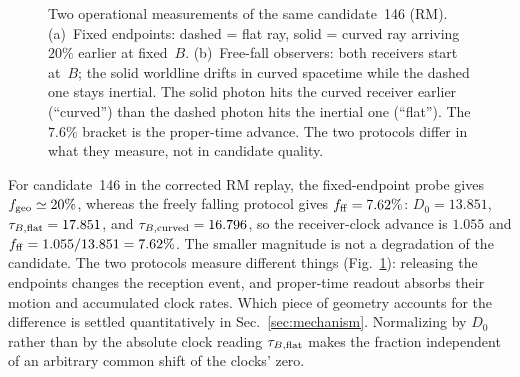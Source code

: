 \documentclass[twocolumn,floatfix,aps,prd,nofootinbib]{revtex4-2}
\begin{document}
\begin{figure}[tbp]
{}
\caption{Two operational measurements of the same candidate~146 (RM).
(a)~Fixed endpoints: dashed = flat ray, solid = curved ray arriving $20\%$
earlier at fixed~$B$.
(b)~Free-fall observers: both receivers start at~$B$; the solid worldline
drifts in curved spacetime while the dashed one stays inertial. The solid
photon hits the curved receiver earlier (``curved'') than the dashed photon
hits the inertial one (``flat''). The $7.6\%$ bracket is the proper-time
advance. The two protocols differ in what they measure, not in candidate
quality.}
\label{fig:timing_protocols}
\end{figure}

For candidate~146 in the corrected RM replay, the fixed-endpoint probe gives
$f_{\rm geo}\simeq20\%$, whereas the freely falling protocol gives
$f_{\rm ff}=7.62\%$: $D_0=13.851$, $\tau_{B,\rm flat}=17.851$, and
$\tau_{B,\rm curved}=16.796$, so the receiver-clock advance is $1.055$ and
$f_{\rm ff}=1.055/13.851=7.62\%$. The smaller magnitude is not a degradation of
the candidate. The two protocols measure different things
(Fig.~\ref{fig:timing_protocols}): releasing the endpoints changes the
reception event, and proper-time readout absorbs their motion and accumulated
clock rates. Which piece of geometry accounts for the difference is settled
quantitatively in Sec.~\ref{sec:mechanism}. Normalizing by $D_0$ rather than by
the absolute clock reading $\tau_{B,\rm flat}$ makes the fraction independent
of an arbitrary common shift of the clocks' zero.
\end{document}
